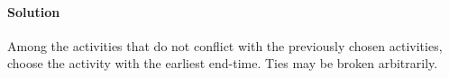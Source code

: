 \paragraph{Solution}
Among the activities that do not conflict with the previously chosen
activities, choose the activity with the earliest end-time.
Ties may be broken arbitrarily.


